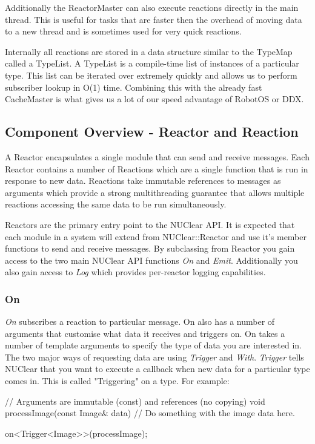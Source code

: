 \documentclass[english,12pt]{scrartcl}
\begin{document}
				Additionally the ReactorMaster can also execute reactions directly in the main thread. 
				This is useful for tasks that are faster then the overhead of moving data to a new thread and is sometimes used for very quick reactions.
			
				Internally all reactions are stored in a data structure similar to the TypeMap called a TypeList. 
				A TypeList is a compile-time list of instances of a particular type. This list can be iterated over extremely quickly and allows us to perform subscriber lookup in O(1) time.
				Combining this with the already fast CacheMaster is what gives us a lot of our speed advantage of RobotOS or DDX.
		
		\subsection{Component Overview - Reactor and Reaction}
			A Reactor encapsulates a single module that can send and receive messages.
			Each Reactor contains a number of Reactions which are a single function that is run in response to new data. 
			Reactions take immutable references to messages as arguments which provide a strong multithreading guarantee that allows multiple reactions accessing the same data to be run simultaneously.
			
			Reactors are the primary entry point to the NUClear API. 
			It is expected that each module in a system will extend from NUClear::Reactor and use it's member functions to send and receive messages.
			By subclassing from Reactor you gain access to the two main NUClear API functions \emph{On} and \emph{Emit}. 
			Additionally you also gain access to \emph{Log} which provides per-reactor logging capabilities.
	
			\subsubsection{On}
				\emph{On} subscribes a reaction to particular message. 
				On also has a number of arguments that customise what data it receives and triggers on.
				On takes a number of template arguments to specify the type of data you are interested in. 
				The two major ways of requesting data are using \emph{Trigger} and \emph{With}.
				\emph{Trigger} tells NUClear that you want to execute a callback when new data for a particular type comes in.
				This is called "Triggering" on a type. 
				For example:
				
				\begin{cppcode}
					// Arguments are immutable (const) and references (no copying)
					void processImage(const Image& data) {
					    // Do something with the image data here.
					}
				
					on<Trigger<Image>>(processImage);
				\end{cppcode}
				
\end{document}
